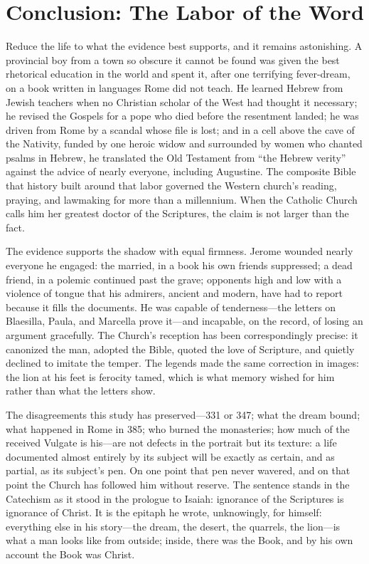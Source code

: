 \section{Conclusion: The Labor of the Word}

Reduce the life to what the evidence best supports, and it remains
astonishing. A provincial boy from a town so obscure it cannot be found was
given the best rhetorical education in the world and spent it, after one
terrifying fever-dream, on a book written in languages Rome did not teach. He
learned Hebrew from Jewish teachers when no Christian scholar of the West had
thought it necessary; he revised the Gospels for a pope who died before
the resentment landed; he was driven from Rome by a scandal whose file is
lost; and in a cell above the cave of the Nativity, funded by one heroic
widow and surrounded by women who chanted psalms in Hebrew, he translated the
Old Testament from ``the Hebrew verity'' against the advice of nearly
everyone, including Augustine. The composite Bible that history built around
that labor governed the Western church's reading, praying, and lawmaking for
more than a millennium. When the Catholic Church calls him her greatest
doctor of the Scriptures, the claim is not larger than the fact.

The evidence supports the shadow with equal firmness. Jerome wounded nearly
everyone he engaged: the married, in a book his own friends suppressed; a
dead friend, in a polemic continued past the grave; opponents high and low
with a violence of tongue that his admirers, ancient and modern, have had to
report because it fills the documents. He was capable of tenderness---the
letters on Blaesilla, Paula, and Marcella prove it---and incapable, on the
record, of losing an argument gracefully. The Church's reception has been
correspondingly precise: it canonized the man, adopted the Bible, quoted the
love of Scripture, and quietly declined to imitate the temper. The legends
made the same correction in images: the lion at his feet is ferocity tamed,
which is what memory wished for him rather than what the letters show.

The disagreements this study has preserved---331 or 347; what the dream
bound; what happened in Rome in 385; who burned the monasteries; how much of
the received Vulgate is his---are not defects in the portrait but its
texture: a life documented almost entirely by its subject will be exactly as
certain, and as partial, as its subject's pen. On one point that pen never
wavered, and on that point the Church has followed him without reserve. The
sentence stands in the Catechism as it stood in the prologue to Isaiah:
ignorance of the Scriptures is ignorance of Christ. It is the epitaph he
wrote, unknowingly, for himself: everything else in his story---the dream,
the desert, the quarrels, the lion---is what a man looks like from outside;
inside, there was the Book, and by his own account the Book was Christ.
